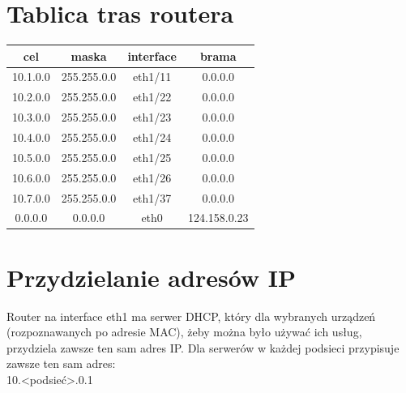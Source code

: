 \documentclass{article}
\begin{document}
  \section{Tablica tras routera}
    \begin{tabular}{|c|c|c|c|}
      cel & maska & interface & brama \\
      \hline
      \textcolor{kolorAdministracyjna}{10.1.0.0} & \textcolor{kolorAdministracyjna}{255.255.0.0} & \textcolor{kolorAdministracyjna}{eth1/11} & \textcolor{kolorAdministracyjna}{0.0.0.0} \\
      \hline
      \textcolor{kolorZarzad}{10.2.0.0} & \textcolor{kolorZarzad}{255.255.0.0} & \textcolor{kolorZarzad}{eth1/22} & \textcolor{kolorZarzad}{0.0.0.0} \\
      \hline
      \textcolor{kolorPrawny}{10.3.0.0} & \textcolor{kolorPrawny}{255.255.0.0} & \textcolor{kolorPrawny}{eth1/23} & \textcolor{kolorPrawny}{0.0.0.0} \\
      \hline
      \textcolor{kolorProgramistyczny}{10.4.0.0} & \textcolor{kolorProgramistyczny}{255.255.0.0} & \textcolor{kolorProgramistyczny}{eth1/24} & \textcolor{kolorProgramistyczny}{0.0.0.0} \\
      \hline
      \textcolor{kolorGraficzny}{10.5.0.0} & \textcolor{kolorGraficzny}{255.255.0.0} & \textcolor{kolorGraficzny}{eth1/25} & \textcolor{kolorGraficzny}{0.0.0.0} \\
      \hline
      \textcolor{kolorKsiegowy}{10.6.0.0} & \textcolor{kolorKsiegowy}{255.255.0.0} & \textcolor{kolorKsiegowy}{eth1/26} & \textcolor{kolorKsiegowy}{0.0.0.0} \\
      \hline
      \textcolor{kolorGoscinna}{10.7.0.0} & \textcolor{kolorGoscinna}{255.255.0.0} & \textcolor{kolorGoscinna}{eth1/37} & \textcolor{kolorGoscinna}{0.0.0.0} \\
      \hline
      0.0.0.0 & 0.0.0.0 & eth0 & 124.158.0.23 \\
    \end{tabular}


  \section{Przydzielanie adresów IP}
    Router na interface eth1 ma serwer DHCP, który dla wybranych urządzeń (rozpoznawanych po adresie MAC), żeby można było używać ich usług, przydziela zawsze ten sam adres IP.
    Dla serwerów w każdej podsieci przypisuje zawsze ten sam adres: \\
    10.<podsieć>.0.1
\end{document}
